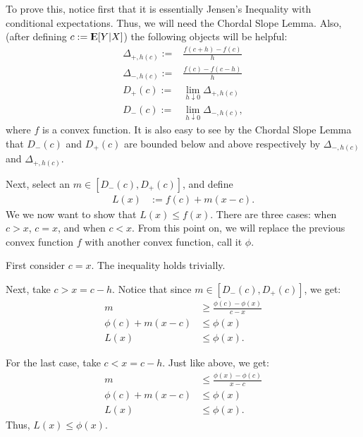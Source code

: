 \documentclass[12pt]{paper}
\newcommand{\Expect}{{\rm I\kern-.3em E}}
\begin{document}
To prove this, notice first that it is essentially Jensen's Inequality with conditional expectations. Thus, we will need the Chordal Slope Lemma. Also, (after defining $c:=\Expect[Y|X]$) the following objects will be helpful:
\begin{align*}
\Delta_{+,h(c)} :=& \frac{f(c+h)-f(c)}{h}\\
\Delta_{-,h(c)}:=&\frac{f(c)-f(c-h)}{h}\\
D_+(c):=&\lim_{h\downarrow0}\Delta_{+,h(c)}\\
D_-(c):=&\lim_{h\downarrow0}\Delta_{-,h(c)},
\end{align*}
where $f$ is a convex function. It is also easy to see by the Chordal Slope Lemma that $D_-(c)$ and $D_+(c)$ are bounded below and above respectively by $\Delta_{-,h(c)}$ and $\Delta_{+,h(c)}$.

Next, select an $m \in [D_-(c),D_+(c)]$, and define
\begin{align*}
L(x)&:=f(c)+m(x-c).
\end{align*}
We we now want to show that $L(x)\leq f(x)$. There are three cases: when $c>x$, $c=x$, and when $c<x$. From this point on, we will replace the previous convex function $f$ with another convex function, call it $\phi$.

First consider $c=x$. The inequality holds trivially.

Next, take $c>x=c-h$. Notice that since $m \in [D_-(c),D_+(c)]$, we get:
\begin{align*}
m&\geq \frac{\phi(c)-\phi(x)}{c-x}\\
\phi(c)+m(x-c)&\leq \phi(x)\\
L(x)&\leq \phi(x).
\end{align*}

For the last case, take $c<x=c-h$. Just like above, we get:
\begin{align*}
m&\leq \frac{\phi(x)-\phi(c)}{x-c}\\
\phi(c)+m(x-c)&\leq \phi(x)\\
L(x)&\leq \phi(x).
\end{align*}
Thus, $L(x)\leq\phi(x)$.
\end{document}
